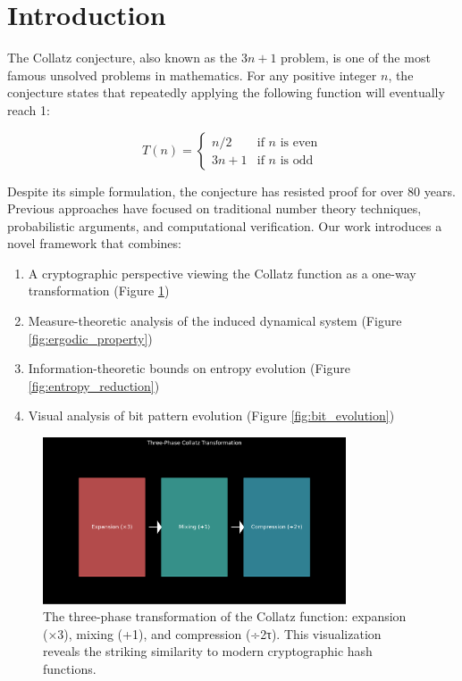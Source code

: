 \section{Introduction}

The Collatz conjecture, also known as the $3n+1$ problem, is one of the most famous unsolved problems in mathematics. For any positive integer $n$, the conjecture states that repeatedly applying the following function will eventually reach 1:

\[
T(n) = \begin{cases}
n/2 & \text{if } n \text{ is even} \\
3n + 1 & \text{if } n \text{ is odd}
\end{cases}
\]

Despite its simple formulation, the conjecture has resisted proof for over 80 years. Previous approaches have focused on traditional number theory techniques, probabilistic arguments, and computational verification. Our work introduces a novel framework that combines:

\begin{enumerate}
\item A cryptographic perspective viewing the Collatz function as a one-way transformation (Figure \ref{fig:transformation_phases})
\item Measure-theoretic analysis of the induced dynamical system (Figure \ref{fig:ergodic_property})
\item Information-theoretic bounds on entropy evolution (Figure \ref{fig:entropy_reduction})
\item Visual analysis of bit pattern evolution (Figure \ref{fig:bit_evolution})
\end{enumerate}

\begin{figure}[h]
\centering
\includegraphics[width=0.8\textwidth]{figures/transformation_phases.svg}
\caption{The three-phase transformation of the Collatz function: expansion (×3), mixing (+1), and compression (÷2τ). This visualization reveals the striking similarity to modern cryptographic hash functions.}
\label{fig:transformation_phases}
\end{figure}

